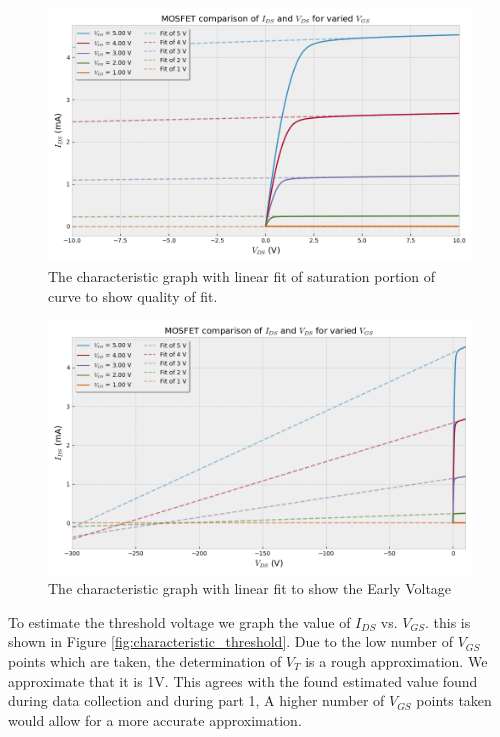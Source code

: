 \begin{figure}[ht]
    \centering
    \includegraphics[width=.825\linewidth]{figures/characteristic_tight_fit.png}
    \caption{The characteristic graph with linear fit of saturation portion of curve to show quality of fit.}
    \label{fig:characteristic_tight_fit}
\end{figure}

\begin{figure}[ht]
    \centering
    \includegraphics[width=.825\linewidth]{figures/characteristic_wide_fit.png}
    \caption{The characteristic graph with linear fit to show the Early Voltage}
    \label{fig:characteristic_wide_fit}
\end{figure}

\clearpage

To estimate the threshold voltage we graph the value of $I_{DS}$ vs. $V_{GS}$. this is shown in Figure \ref{fig:characteristic_threshold}. Due to the low number of $V_{GS}$ points which are taken, the determination of $V_T$ is a rough approximation. We approximate that it is 1V. This agrees with the found estimated value found during data collection and during part 1, A higher number of $V_{GS}$ points taken would allow for a more accurate approximation.

